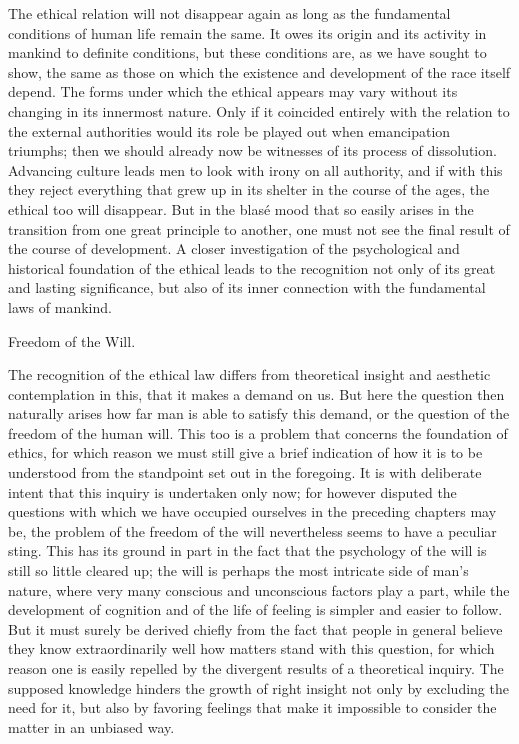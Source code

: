 \documentclass[12pt,a4paper,openany]{book}
\newcommand{\opage}[1]{\marginnote{\footnotesize\textit{[#1]}}}
\newcommand{\chap}[1]{\clearpage\addcontentsline{toc}{chapter}{#1}\vspace*{2em}\begin{center}{\large #1}\end{center}\medskip}
\begin{document}
The ethical relation will not disappear again as long as the
fundamental conditions of human life remain the same. It owes its origin
and its activity in mankind to definite conditions, \opage{107}but these
conditions are, as we have sought to show, the same as those on which the
existence and development of the race itself depend. The forms under which
the ethical appears may vary without its changing in its innermost nature.
Only if it coincided entirely with the relation to the external
authorities would its role be played out when emancipation triumphs; then
we should already now be witnesses of its process of dissolution.
Advancing culture leads men to look with irony on all authority, and if
with this they reject everything that grew up in its shelter in the course
of the ages, the ethical too will disappear. But in the blasé mood that so
easily arises in the transition from one great principle to another, one
must not see the final result of the course of development. A closer
investigation of the psychological and historical foundation of the ethical
leads to the recognition not only of its great and lasting significance,
but also of its inner connection with the fundamental laws of mankind.

\chap{Freedom of the Will.}
\opage{108}The recognition of the ethical law differs from theoretical insight
and aesthetic contemplation in this, that it makes a demand on us. But here
the question then naturally arises how far man is able to satisfy this demand,
or the question of the freedom of the human will. This too is a problem that
concerns the foundation of ethics, for which reason we must still give a brief
indication of how it is to be understood from the standpoint set out in the
foregoing. It is with deliberate intent that this inquiry is undertaken only
now; for however disputed the questions with which we have occupied ourselves
in the preceding chapters may be, the problem of the freedom of the will
nevertheless seems to have a peculiar sting. This has its ground in part in
the fact that the psychology of the will is still so little cleared up; the
will is perhaps the most intricate side of man's nature, where very many
conscious and unconscious factors play a part, while \opage{109}the
development of cognition and of the life of feeling is simpler and easier to
follow. But it must surely be derived chiefly from the fact that people in
general believe they know extraordinarily well how matters stand with this
question, for which reason one is easily repelled by the divergent results of
a theoretical inquiry. The supposed knowledge hinders the growth of right
insight not only by excluding the need for it, but also by favoring feelings
that make it impossible to consider the matter in an unbiased way.
\end{document}
